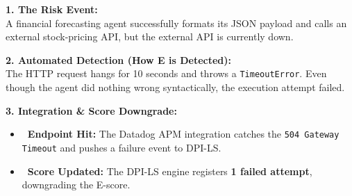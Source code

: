 \documentclass[11pt,a4paper]{article}
\begin{document}
\begin{tcolorbox}[enhanced, colback=gray!5!white, colframe=gray, title={\textbf{\faNetworkWired\ Scenario 2: The Unstable External API (Network Timeout)}}, fonttitle=\bfseries, boxrule=1pt, arc=2mm]
\textbf{\color{dpired} 1. The Risk Event:}\\
A financial forecasting agent successfully formats its JSON payload and calls an external stock-pricing API, but the external API is currently down.

\vspace{0.2cm}
\textbf{\color{dpicloud} 2. Automated Detection (How E is Detected):}\\
The HTTP request hangs for 10 seconds and throws a \texttt{TimeoutError}. Even though the agent did nothing wrong syntactically, the execution attempt failed.

\vspace{0.2cm}
\textbf{\color{dpigreen} 3. Integration \& Score Downgrade:}\\
\begin{itemize}
    \item \textbf{\color{gray}\faSitemap\ Endpoint Hit:} The Datadog APM integration catches the \texttt{504 Gateway Timeout} and pushes a failure event to DPI-LS.
    \item \textbf{\color{gray}\faSortNumericDown\ Score Updated:} The DPI-LS engine registers \textbf{1 failed attempt}, downgrading the E-score.
\end{itemize}
\end{tcolorbox}

\vspace{0.3cm}
\end{document}
